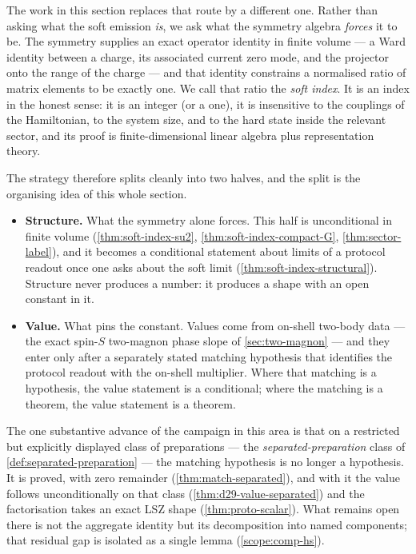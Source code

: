 The work in this section replaces that route by a different one. Rather than
asking what the soft emission \emph{is}, we ask what the symmetry algebra
\emph{forces} it to be. The symmetry supplies an exact operator identity in
finite volume --- a Ward identity between a charge, its associated current
zero mode, and the projector onto the range of the charge --- and that identity
constrains a normalised ratio of matrix elements to be exactly one. We call
that ratio the \emph{soft index}. It is an index in the honest sense: it is
an integer (or a one), it is insensitive to the couplings of the Hamiltonian,
to the system size, and to the hard state inside the relevant sector, and its
proof is finite-dimensional linear algebra plus representation theory.

The strategy therefore splits cleanly into two halves, and the split is the
organising idea of this whole section.

\begin{itemize}
\item \textbf{Structure.} What the symmetry alone forces. This half is
  unconditional in finite volume (\cref{thm:soft-index-su2},
  \cref{thm:soft-index-compact-G}, \cref{thm:sector-label}), and it becomes a
  conditional statement about limits of a protocol readout once one asks about
  the soft limit (\cref{thm:soft-index-structural}). Structure never produces
  a number: it produces a shape with an open constant in it.
\item \textbf{Value.} What pins the constant. Values come from on-shell
  two-body data --- the exact spin-$S$ two-magnon phase slope of
  \cref{sec:two-magnon} --- and they enter only after a separately stated
  matching hypothesis that identifies the protocol readout with the on-shell
  multiplier. Where that matching is a hypothesis, the value statement is a
  conditional; where the matching is a theorem, the value statement is a
  theorem.
\end{itemize}

The one substantive advance of the campaign in this area is that on a
restricted but explicitly displayed class of preparations --- the
\emph{separated-preparation} class of \cref{def:separated-preparation} --- the
matching hypothesis is no longer a hypothesis. It is proved, with zero
remainder (\cref{thm:match-separated}), and with it the value follows
unconditionally on that class (\cref{thm:d29-value-separated}) and the
factorisation takes an exact LSZ shape (\cref{thm:proto-scalar}). What remains
open there is not the aggregate identity but its decomposition into named
components; that residual gap is isolated as a single lemma
(\cref{scope:comp-hs}).

